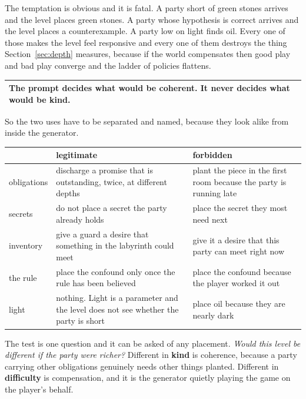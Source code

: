 \documentclass[11pt,a4paper]{article}
\begin{document}
The temptation is obvious and it is fatal. A party short of green stones arrives and the level
places green stones. A party whose hypothesis is correct arrives and the level places a
counterexample. A party low on light finds oil. Every one of those makes the level feel
responsive and every one of them destroys the thing Section~\ref{sec:depth} measures, because if
the world compensates then good play and bad play converge and the ladder of policies flattens.

\begin{center}
\begin{tabular}{@{}>{\raggedright\arraybackslash}p{}@{}}
\toprule
\textbf{The prompt decides what would be coherent. It never decides what would be kind.} \\
\bottomrule
\end{tabular}
\end{center}

So the two uses have to be separated and named, because they look alike from inside the generator.

\begin{center}
\begin{tabular}{@{}l@{\hspace{3mm}}>{\raggedright\arraybackslash}p{}@{\hspace{3mm}}>{\raggedright\arraybackslash}p{}@{}}
\toprule
& \textbf{legitimate} & \textbf{forbidden} \\
\midrule
obligations & discharge a promise that is outstanding, twice, at different depths &
plant the piece in the first room because the party is running late \\[1mm]
secrets     & do not place a secret the party already holds &
place the secret they most need next \\[1mm]
inventory   & give a guard a desire that something in the labyrinth could meet &
give it a desire that this party can meet right now \\[1mm]
the rule    & place the confound only once the rule has been believed &
place the confound because the player worked it out \\[1mm]
light       & nothing. Light is a parameter and the level does not see whether the party is short &
place oil because they are nearly dark \\
\bottomrule
\end{tabular}
\end{center}

\begin{sectionbox}
The test is one question and it can be asked of any placement. \emph{Would this level be different
if the party were richer?} Different in \textbf{kind} is coherence, because a party carrying other
obligations genuinely needs other things planted. Different in \textbf{difficulty} is compensation,
and it is the generator quietly playing the game on the player's behalf.
\end{sectionbox}
\end{document}
